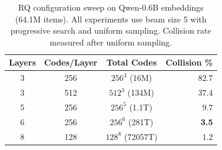 \documentclass[]{fairmeta}
\begin{document}
\begin{table}[h]
\caption{RQ configuration sweep on Qwen-0.6B embeddings (64.1M items). All experiments use beam size 5 with progressive search and uniform sampling. Collision rate measured after uniform sampling.}
\label{tab:rq_config}
\centering
\small
\begin{tabular}{cccr}
\toprule
\textbf{Layers} & \textbf{Codes/Layer} & \textbf{Total Codes} & \textbf{Collision \%} \\
\midrule
3 & 256 & $256^3$ (16M) & 82.7 \\
3 & 512 & $512^3$ (134M) & 37.4 \\
5 & 256 & $256^5$ (1.1T) & 9.7 \\
6 & 256 & $256^6$ (281T) & \textbf{3.5} \\
8 & 128 & $128^8$ (72057T) & 1.2 \\
\bottomrule
\end{tabular}
\end{table}



\end{document}
